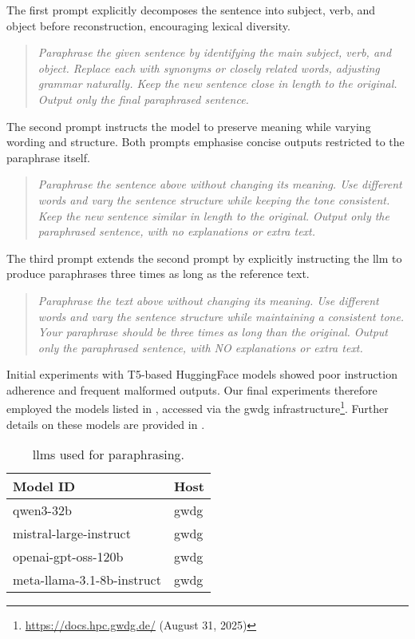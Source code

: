 The first prompt explicitly decomposes the sentence into subject, verb, and object before reconstruction, encouraging lexical diversity. 
\begin{quote}
    \textit{Paraphrase the given sentence by identifying the main subject, verb, and object. Replace each with synonyms or closely related words, adjusting grammar naturally. Keep the new sentence close in length to the original. Output only the final paraphrased sentence.}
\end{quote}

The second prompt instructs the model to preserve meaning while varying wording and structure. 
Both prompts emphasise concise outputs restricted to the paraphrase itself.
\begin{quote}
    \textit{Paraphrase the sentence above without changing its meaning. Use different words and vary the sentence structure while keeping the tone consistent. Keep the new sentence similar in length to the original. Output only the paraphrased sentence, with no explanations or extra text.}
\end{quote}

The third prompt extends the second prompt by explicitly instructing the \ac{llm} to produce paraphrases three times as long as the reference text.
\begin{quote}
  \textit{Paraphrase the text above without changing its meaning. Use different words and vary the sentence structure while maintaining a consistent tone. Your paraphrase should be three times as long than the original. Output only the paraphrased sentence, with NO explanations or extra text.}
\end{quote}

Initial experiments with T5-based HuggingFace models showed poor instruction adherence and frequent malformed outputs. 
Our final experiments therefore employed the models listed in , accessed via the \ac{gwdg} infrastructure\footnote{\url{https://docs.hpc.gwdg.de/} (August 31, 2025)}.
Further details on these models are provided in .

\begin{table}[h]
\centering
\caption{\acp{llm} used for paraphrasing.}
\label{tab:base_llms}
\begin{tabular}{@{}ll@{}}
\toprule
\textbf{Model ID}                    & \textbf{Host} \\
\midrule
qwen3-32b                            & \ac{gwdg}    \\
mistral-large-instruct               & \ac{gwdg}    \\
openai-gpt-oss-120b                  & \ac{gwdg}    \\
meta-llama-3.1-8b-instruct           & \ac{gwdg}    \\
\bottomrule   
\end{tabular}%
\end{table}


